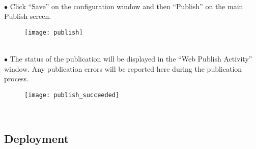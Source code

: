     \ \\
    \tab $\bullet$ Click ``Save'' on the configuration window and then ``Publish'' on the main Publish screen.
    \begin{figure}[H] 
        \centering
        \texttt{[image: publish]}
    \end{figure}
    
    \ \\
    \tab $\bullet$ The status of the publication will be displayed in the ``Web Publish Activity'' window.  Any publication errors will be reported here during the publication process.
    \begin{figure}[H] 
        \centering
        \texttt{[image: publish\_succeeded]}
    \end{figure}
    \ \\
\subsection{Deployment}